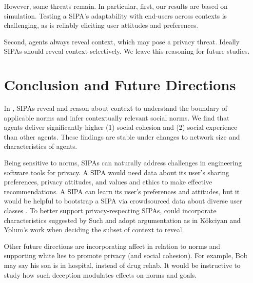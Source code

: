 However, some threats remain. In particular, first, our results are based on simulation. Testing a SIPA's adaptability with end-users across contexts is challenging, as is reliably eliciting user attitudes and preferences. 

Second, \frameworkB agents always reveal context, which may pose a privacy threat. Ideally SIPAs should reveal context selectively. We leave this reasoning for future studies. 

\section{Conclusion and Future Directions}
\label{sec:Poros-discussion}

In \frameworkB, SIPAs reveal and reason about context to understand the boundary of applicable norms and infer contextually relevant social norms. 
We find that \frameworkB agents deliver significantly higher (1) social cohesion and (2) social experience than other agents. These findings are stable under changes to network size and characteristics of agents.

Being sensitive to norms, \frameworkB SIPAs can naturally address challenges in engineering software tools for privacy.  A SIPA would need data about its user's sharing preferences, privacy attitudes, and values and ethics \citep{Ajmeri-IC18-Ethical} to make effective recommendations. A SIPA can learn its user's preferences and attitudes, but it would be helpful to bootstrap a SIPA via crowdsourced data about diverse user classes \citep{TOCHI-17:Multiuser,IC-17:SoSharP}. To better support privacy-respecting SIPAs, \frameworkB could incorporate characteristics suggested by Such  and adopt argumentation as in K{\"o}kciyan and Yolum's  work when deciding the subset of context to reveal.

Other future directions are incorporating affect in relation to norms
\citep{Ferreira-AAAI13-GroupRelations} 
and supporting white lies to promote privacy (and social cohesion). For example, Bob may say his son is in hospital, instead of drug rehab. It would be instructive to study how such deception modulates 
effects on norms and goals.